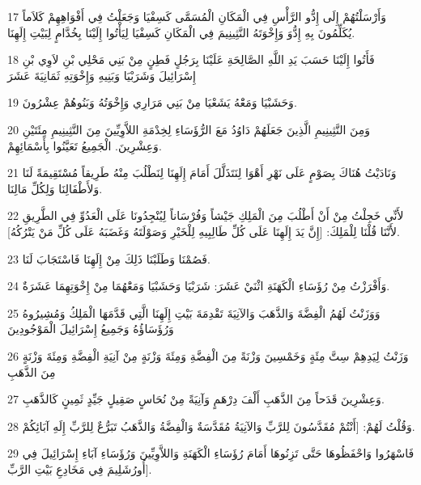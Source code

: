 \par 17 وَأَرْسَلْتُهُمْ إِلَى إِدُّو الرَّأْسِ فِي الْمَكَانِ الْمُسَمَّى كَسِفْيَا وَجَعَلْتُ فِي أَفْوَاهِهِمْ كَلاَماً يُكَلِّمُونَ بِهِ إِدُّوَ وَإِخْوَتَهُ النَّثِينِيمَ فِي الْمَكَانِ كَسِفْيَا لِيَأْتُوا إِلَيْنَا بِخُدَّامٍ لِبَيْتِ إِلَهِنَا.
\par 18 فَأَتُوا إِلَيْنَا حَسَبَ يَدِ اللَّهِ الصَّالِحَةِ عَلَيْنَا بِرَجُلٍ فَطِنٍ مِنْ بَنِي مَحْلِي بْنِ لاَوِي بْنِ إِسْرَائِيلَ وَشَرَبْيَا وَبَنِيهِ وَإِخْوَتِهِ ثَمَانِيَةَ عَشَرَ
\par 19 وَحَشَبْيَا وَمَعَْهُ يَشَعْيَا مِنْ بَنِي مَرَارِي وَإِخْوَتُهُ وَبَنُوهُمْ عِشْرُونَ.
\par 20 وَمِنَ النَّثِينِيمِ الَّذِينَ جَعَلَهُمْ دَاوُدُ مَعَ الرُّؤَسَاءِ لِخِدْمَةِ اللاَّوِيِّينَ مِنَ النَّثِينِيمِ مِئَتَيْنِ وَعِشْرِينَ. الْجَمِيعُ تَعَيَّنُوا بِأَسْمَائِهِمْ.
\par 21 وَنَادَيْتُ هُنَاكَ بِصَوْمٍ عَلَى نَهْرِ أَهْوَا لِنَتَذَلَّلَ أَمَامَ إِلَهِنَا لِنَطْلُبَ مِنْهُ طَرِيقاً مُسْتَقِيمَةً لَنَا وَلأَطْفَالِنَا وَلِكُلِّ مَالِنَا.
\par 22 لأَنِّي خَجِلْتُ مِنْ أَنْ أَطْلُبَ مِنَ الْمَلِكِ جَيْشاً وَفُرْسَاناً لِيُنْجِدُونَا عَلَى الْعَدُوِّ فِي الطَّرِيقِ لأَنَّنَا قُلْنَا لِلْمَلِكَ: [إِنَّ يَدَ إِلَهِنَا عَلَى كُلِّ طَالِبِيهِ لِلْخَيْرِ وَصَوْلَتَهُ وَغَضَبَهُ عَلَى كُلِّ مَنْ يَتْرُكُهُ].
\par 23 فَصُمْنَا وَطَلَبْنَا ذَلِكَ مِنْ إِلَهِنَا فَاسْتَجَابَ لَنَا.
\par 24 وَأَفْرَزْتُ مِنْ رُؤَسَاءِ الْكَهَنَةِ اثْنَيْ عَشَرَ: شَرَبْيَا وَحَشَبْيَا وَمَعَْهُمَا مِنْ إِخْوَتِهِمَا عَشَرَةٌ.
\par 25 وَوَزَنْتُ لَهُمُ الْفِضَّةَ وَالذَّهَبَ وَالآنِيَةَ تَقْدِمَةَ بَيْتِ إِلَهِنَا الَّتِي قَدَّمَهَا الْمَلِكُ وَمُشِيرُوهُ وَرُؤَسَاؤُهُ وَجَمِيعُ إِسْرَائِيلَ الْمَوْجُودِينَ
\par 26 وَزَنْتُ لِيَدِهِمْ سِتَّ مِئَةٍ وَخَمْسِينَ وَزْنَةً مِنَ الْفِضَّةِ وَمِئَةَ وَزْنَةٍ مِنْ آنِيَةِ الْفِضَّةِ وَمِئَةَ وَزْنَةٍ مِنَ الذَّهَبِ
\par 27 وَعِشْرِينَ قَدَحاً مِنَ الذَّهَبِ أَلْفَ دِرْهَمٍ وَآنِيَةً مِنْ نُحَاسٍ صَقِيلٍ جَيِّدٍ ثَمِينٍ كَالذَّهَبِ.
\par 28 وَقُلْتُ لَهُمْ: [أَنْتُمْ مُقَدَّسُونَ لِلرَّبِّ وَالآنِيَةُ مُقَدَّسَةٌ وَالْفِضَّةُ وَالذَّهَبُ تَبَرُّعٌ لِلرَّبِّ إِلَهِ آبَائِكُمْ.
\par 29 فَاسْهَرُوا وَاحْفَظُوهَا حَتَّى تَزِنُوهَا أَمَامَ رُؤَسَاءِ الْكَهَنَةِ وَاللاَّوِيِّينَ وَرُؤَسَاءِ آبَاءِ إِسْرَائِيلَ فِي أُورُشَلِيمَ فِي مَخَادِعِ بَيْتِ الرَّبِّ].
